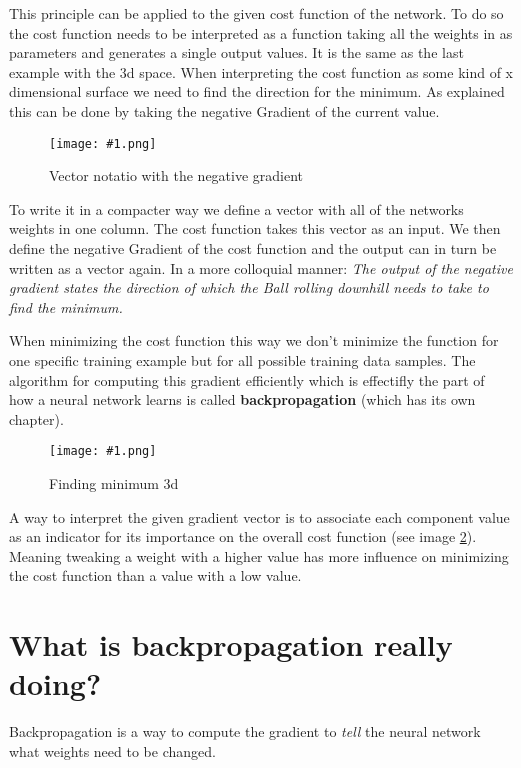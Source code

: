 \documentclass{article}
\newcommand{\lbl}[1]{(see image \ref{#1})}
\newcommand{\img}[1]{
	\centering
	\texttt{[image: \#1.png]}
	\label{#1}
}
\begin{document}
This principle can be applied to the given cost function of the network. To do so the cost function needs to be interpreted as a function taking all the weights in as parameters and generates a single output values. It is the same as the last example with the 3d space. When interpreting the cost function as some kind of x dimensional surface we need to find the direction for the minimum. As explained this can be done by taking the negative Gradient of the current value. 

\begin{figure}[!htbp]
\img{ai_17}
\caption{Vector notatio with the negative gradient}
\end{figure}

To write it in a compacter way we define a vector with all of the networks weights in one column. The cost function takes this vector as an input. We then define the negative Gradient of the cost function and the output can in turn be written as a vector again. In a more colloquial manner: \textit{The output of the negative gradient states the direction of which the Ball rolling downhill needs to take to find the minimum.}

When minimizing the cost function this way we don't minimize the function for one specific training example but for all possible training data samples. The algorithm for computing this gradient efficiently which is effectifly the part of how a neural network learns is called \textbf{backpropagation} (which has its own chapter). 

\begin{figure}[!htbp]
\img{ai_18}
\caption{Finding minimum 3d}
\end{figure}

A way to interpret the given gradient vector is to associate each component value as an indicator for its importance on the overall cost function \lbl{ai_18}. Meaning tweaking a weight with a higher value has more influence on minimizing the cost function than a value with a low value.




\section{What is backpropagation really doing?}

Backpropagation is a way to compute the gradient to \textit{tell} the neural network what weights need to be changed. 
\end{document}
